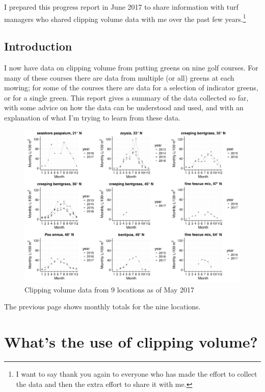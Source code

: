 \documentclass[12pt,b5,]{tufte-book}
\begin{document}
I prepared this progress report in June 2017 to share information with turf managers who shared clipping volume data with me over the past few years.\footnote{I want to say thank you again to everyone who has made the effort
  to collect the data and then the extra effort to share it with me.}

\hypertarget{introduction}{%
\subsection*{Introduction}\label{introduction}}

I now have data on clipping volume from putting greens on nine golf
courses. For many of these courses there are data from multiple (or all)
greens at each mowing; for some of the courses there are data for a
selection of indicator greens, or for a single green. This report gives
a summary of the data collected so far, with some advice on how the data
can be understood and used, and with an explanation of what I'm trying
to learn from these data.

\begin{figure}
\centering
\includegraphics{figs/clip.png}
\caption{Clipping volume data from 9 locations as of May 2017}
\end{figure}

The previous page shows monthly totals for the nine locations.

\hypertarget{volHistogram}{%
\section{What's the use of clipping volume?}\label{volHistogram}}
\end{document}
